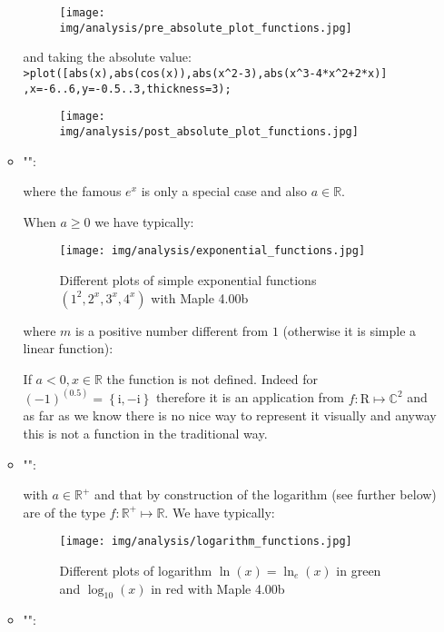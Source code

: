 \begin{enumerate}
\begin{itemize}
			\begin{figure}[H]
				\centering
				\texttt{[image: img/analysis/pre\_absolute\_plot\_functions.jpg]}
			\end{figure}
			
			and taking the absolute value:\\
			
			\texttt{>plot([abs(x),abs(cos(x)),abs(x\string^2-3),abs(x\string^3-4*x\string^2+2*x)]\\
			,x=-6..6,y=-0.5..3,thickness=3);}
			\begin{figure}[H]
				\centering
				\texttt{[image: img/analysis/post\_absolute\_plot\_functions.jpg]}
			\end{figure}
		
		\item "":
			
			where the famous $e^x$ is only a special case and also $a\in\mathbb{R}$.
			
			When $a\geq 0$ we have typically:
			\begin{figure}[H]
				\centering
				\texttt{[image: img/analysis/exponential\_functions.jpg]}
				\caption{Different plots of simple exponential functions $(1^2,2^x,3^x,4^x)$ with Maple 4.00b}
			\end{figure}
			where $m$ is a positive number different from $1$ (otherwise it is simple a linear function):
			
			If $a<0,x\in\mathbb{R}$ the function is not defined. Indeed for $(-1)^(0.5)=\left\lbrace \mathrm{i},	-\mathrm{i}	\right\rbrace$ therefore it is an application from $f:\mathrm{R}\mapsto\mathbb{C}^2$ and as far as we know there is no nice way to represent it visually and anyway this is not a function in the traditional way.
			
			\item "":
				
			with $a\in\mathbb{R}^{+}$ and that by construction of the logarithm (see further below) are of the type $f:\mathbb{R}^{+}\mapsto \mathbb{R}$.
			We have typically:
			\begin{figure}[H]
				\centering
				\texttt{[image: img/analysis/logarithm\_functions.jpg]}
				\caption{Different plots of logarithm $\ln(x)=\ln_e(x)$ in green and $\log_{10}(x)$ in red with Maple 4.00b}
			\end{figure}
			
			\item "":
			

\end{itemize}
\end{enumerate}
